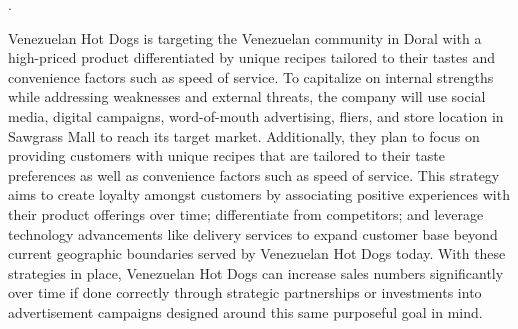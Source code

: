 .


Venezuelan Hot Dogs is targeting the Venezuelan community in Doral with a high-priced product differentiated by unique recipes tailored to their tastes and convenience factors such as speed of service. To capitalize on internal strengths while addressing weaknesses and external threats, the company will use social media, digital campaigns, word-of-mouth advertising, fliers, and store location in Sawgrass Mall to reach its target market. Additionally, they plan to focus on providing customers with unique recipes that are tailored to their taste preferences as well as convenience factors such as speed of service. This strategy aims to create loyalty amongst customers by associating positive experiences with their product offerings over time; differentiate from competitors; and leverage technology advancements like delivery services to expand customer base beyond current geographic boundaries served by Venezuelan Hot Dogs today. With these strategies in place, Venezuelan Hot Dogs can increase sales numbers significantly over time if done correctly through strategic partnerships or investments into advertisement campaigns designed around this same purposeful goal in mind.